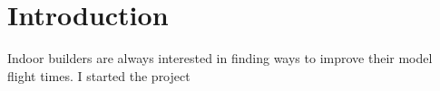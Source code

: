 \section{Introduction}


Indoor builders are always interested in finding ways to improve their model
flight times. I started the project  \cite{durand4}
